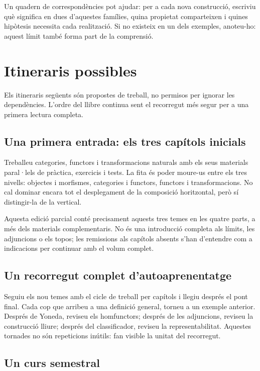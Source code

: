 Un quadern de correspondències pot ajudar: per a cada nova
construcció, escriviu què significa en dues d'aquestes famílies,
quina propietat comparteixen i quines hipòtesis necessita
cada realització. Si no existeix en un dels exemples, anoteu-ho:
aquest límit també forma part de la comprensió.

\section{Itineraris possibles}

Els itineraris següents són propostes de treball, no permisos
per ignorar les dependències. L'ordre del llibre continua sent
el recorregut més segur per a una primera lectura completa.

\subsection*{Una primera entrada: els tres capítols inicials}

Treballeu categories, functors i transformacions naturals amb
els seus materials paral·lels de pràctica, exercicis i tests.
La fita és poder moure-us entre els tres nivells: objectes i
morfismes, categories i functors, functors i transformacions.
No cal dominar encara tot el desplegament de la composició
horitzontal, però sí distingir-la de la vertical.

\ifpublicacioparcial
Aquesta edició parcial conté precisament aquests tres temes en
les quatre parts, a més dels materials complementaris. No és una
introducció completa als límits, les adjuncions o els topos;
les remissions als capítols absents s'han d'entendre com a
indicacions per continuar amb el volum complet.
\fi

\subsection*{Un recorregut complet d'autoaprenentatge}

Seguiu els nou temes amb el cicle de treball per capítols i
llegiu després el pont final. Cada cop que arribeu a una
definició general, torneu a un exemple anterior. Després
de Yoneda, reviseu els homfunctors; després de les adjuncions,
reviseu la construcció lliure; després del classificador,
reviseu la representabilitat. Aquestes tornades no són
repeticions inútils: fan visible la unitat del recorregut.

\subsection*{Un curs semestral}

